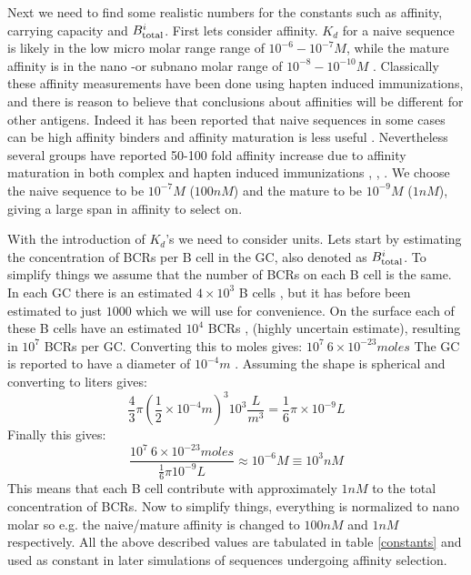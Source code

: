 Next we need to find some realistic numbers for the constants such as affinity, carrying capacity and $B^i_{\text{total}}$.
First lets consider affinity.
$K_d$ for a naive sequence is likely in the low micro molar range range of $10^{-6} - 10^{-7} M$, while the mature affinity is in the nano -or subnano molar range of $10^{-8} - 10^{-10} M$ \cite{berek1987mutation}.
Classically these affinity measurements have been done using hapten induced immunizations, and there is reason to believe that conclusions about affinities will be different for other antigens.
Indeed it has been reported that naive sequences in some cases can be high affinity binders and affinity maturation is less useful \cite{frank2015simple}.
Nevertheless several groups have reported 50-100 fold affinity increase due to affinity maturation in both complex and hapten induced immunizations \cite{Kelsoe_2016}, \cite{phan2006high}, \cite{ulrich1997interplay}.
We choose the naive sequence to be $10^{-7} M$ ($100nM$) and the mature to be $10^{-9} M$ ($1nM$), giving a large span in affinity to select on.

With the introduction of $K_d$'s we need to consider units.
Lets start by estimating the concentration of BCRs per B cell in the GC, also denoted as $B^i_{\text{total}}$.
To simplify things we assume that the number of BCRs on each B cell is the same.
In each GC there is an estimated $4 \times 10^3$ B cells \cite{kroese1990germinal}, but it has before been estimated to just $1000$ \cite{Childs_Baskerville_Cobey_2015} which we will use for convenience.
On the surface each of these B cells have an estimated $10^4$ BCRs \cite{rieckmann2017social}, \cite{immprot} (highly uncertain estimate), resulting in $10^7$ BCRs per GC.
Converting this to moles gives: $10^7\ 6 \times 10^{-23} moles$
The GC is reported to have a diameter of $10^{-4} m$ \cite{Romppanen_1981}.
Assuming the shape is spherical and converting to liters gives:
$$
\frac{4}{3} \pi (\frac{1}{2} \times 10^{-4} m)^3 10^3 \frac{L}{m^3} = \frac{1}{6} \pi \times 10^{-9} L
$$
Finally this gives:
$$\frac{10^7\ 6 \times 10^{-23} moles}{\frac{1}{6} \pi 10^{-9} L} \approx 10^{-6} M \equiv 10^{3} nM
$$
This means that each B cell contribute with approximately $1nM$ to the total concentration of BCRs.
Now to simplify things, everything is normalized to nano molar so e.g. the naive/mature affinity is changed to $100nM$ and $1nM$ respectively.
All the above described values are tabulated in table \ref{constants} and used as constant in later simulations of sequences undergoing affinity selection.

